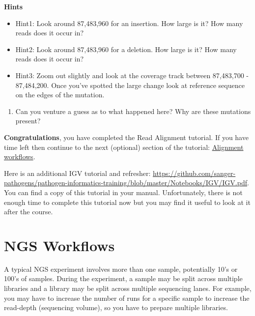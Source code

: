 \documentclass[11pt]{article}
\providecommand{\tightlist}{%
      \setlength{\itemsep}{0pt}\setlength{\parskip}{0pt}}
\begin{document}
\textbf{Hints}

\begin{itemize}
\tightlist
\item
  Hint1: Look around 87,483,960 for an insertion. How large is it? How
  many reads does it occur in?
\item
  Hint2: Look around 87,483,960 for a deletion. How large is it? How
  many reads does it occur in?
\item
  Hint3: Zoom out slightly and look at the coverage track between
  87,483,700 - 87,484,200. Once you've spotted the large change look at
  reference sequence on the edges of the mutation.
\end{itemize}

\begin{enumerate}
\def\labelenumi{\arabic{enumi}.}
\setcounter{enumi}{3}
\tightlist
\item
  Can you venture a guess as to what happened here? Why are these
  mutations present?
\end{enumerate}

    \textbf{Congratulations}, you have completed the Read Alignment tutorial.
If you have time left then continue to the next (optional) section of
the tutorial: \href{workflows.ipynb}{Alignment workflows}.

    Here is an additional IGV tutorial and refresher:
\url{https://github.com/sanger-pathogens/pathogen-informatics-training/blob/master/Notebooks/IGV/IGV.pdf}.
You can find a copy of this tutorial in your manual. Unfortunately,
there is not enough time to complete this tutorial now but you may find
it useful to look at it after the course.





\newpage





    \hypertarget{ngs-workflows}{%
\section{NGS Workflows}\label{ngs-workflows}}

A typical NGS experiment involves more than one sample, potentially 10's
or 100's of samples. During the experiment, a sample may be split across
multiple libraries and a library may be split across multiple
sequencing lanes. For example, you may have to increase the
number of runs for a specific sample to increase the read-depth
(sequencing volume), so you have to prepare multiple libraries.
\end{document}
